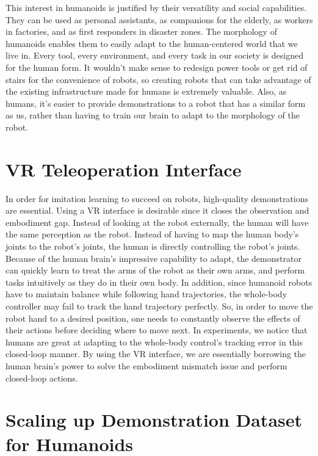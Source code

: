 This interest in humanoids is justified by their versatility and social capabilities. They can be used as personal assistants, as companions for the elderly, as workers in factories, and as first responders in disaster zones. The morphology of humanoids enables them to easily adapt to the human-centered world that we live in. Every tool, every environment, and every task in our society is designed for the human form. It wouldn't make sense to redesign power tools or get rid of stairs for the convenience of robots, so creating robots that can take advantage of the existing infrastructure made for humans is extremely valuable. Also, as humans, it's easier to provide demonstrations to a robot that has a similar form as us, rather than having to train our brain to adapt to the morphology of the robot.

\section {VR Teleoperation Interface}
In order for imitation learning to succeed on robots, high-quality demonstrations are essential. Using a VR interface is desirable since it closes the observation and embodiment gap. Instead of looking at the robot externally, the human will have the same perception as the robot. Instead of having to map the human body's joints to the robot's joints, the human is directly controlling the robot's joints. Because of the human brain's impressive capability to adapt, the demonstrator can quickly learn to treat the arms of the robot as their own arms, and perform tasks intuitively as they do in their own body. In addition, since humanoid robots have to maintain balance while following hand trajectories, the whole-body controller may fail to track the hand trajectory perfectly. So, in order to move the robot hand to a desired position, one needs to constantly observe the effects of their actions before deciding where to move next. In experiments, we notice that humans are great at adapting to the whole-body control's tracking error in this closed-loop manner. By using the VR interface, we are essentially borrowing the human brain's power to solve the embodiment mismatch issue and perform closed-loop actions. 

\section{Scaling up Demonstration Dataset for Humanoids}

